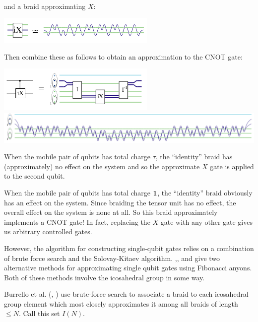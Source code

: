 and a braid approximating $X$:


\begin{center}
\includegraphics[width=3in]{X-small.png}
\end{center}

Then combine these as follows to obtain an approximation to the CNOT gate:

\begin{center}
\includegraphics[width=3in]{CNOT-small.png} \\
\includegraphics[width=6in]{CNOT-large.png}
\end{center}

When the mobile pair of qubits has total charge $\tau$, the ``identity'' braid
has (approximately) no effect on the system and so the approximate $X$ gate is
applied to the second qubit.

When the mobile pair of qubits has total charge $\mathbf{1}$, the ``identity'' braid
obviously has an effect on the system. Since braiding the tensor unit has no
effect, the overall effect on the system is none at all. So this braid
approximately implements a CNOT gate! In fact, replacing the $X$ gate with any
other gate gives us arbitrary controlled gates.

However, the algorithm for constructing single-qubit gates relies on a
combination of brute force search and the Solovay-Kitaev algorithm.
\cite{Burrello2010},\cite{Burrello2011}, and \cite{Mosseri2008} give 
two alternative methods for approximating single qubit gates using Fibonacci
anyons. Both of these methods involve the icosahedral group in some way.

Burrello et al. (\cite{Burrello2010}, \cite{Burrello2011}) use brute-force
search to associate a braid to each icosahedral group element which most
closely approximates it among all braids of length $\leq N$. Call this set
$I(N)$.

